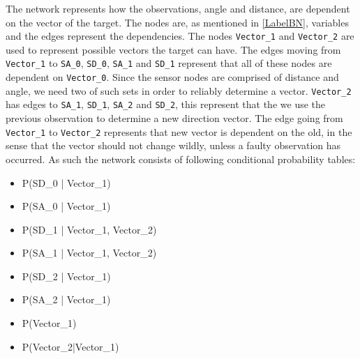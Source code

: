 The network represents how the observations, angle and distance, are dependent
on the vector of the target. The nodes are, as mentioned in \autoref{LabelBN},
variables and the edges represent the dependencies. The nodes
\texttt{Vector\_1} and \texttt{Vector\_2} are used to represent possible
vectors the target can have. The edges moving from \texttt{Vector\_1} to
\texttt{SA\_0}, \texttt{SD\_0}, \texttt{SA\_1} and \texttt{SD\_1} represent
that all of these nodes are dependent on \texttt{Vector\_0}. Since the sensor
nodes are comprised of distance and angle, we need two of such sets in order to
reliably determine a vector. \texttt{Vector\_2} has edges to \texttt{SA\_1},
\texttt{SD\_1}, \texttt{SA\_2} and \texttt{SD\_2}, this represent that the we
use the previous observation to determine a new direction vector. The edge
going from \texttt{Vector\_1} to \texttt{Vector\_2} represents that new vector
is dependent on the old, in the sense that the vector should not change wildly,
unless a faulty observation has occurred. As such the network consists of
following conditional probability tables:
\begin{itemize}
  \item P(SD\_0 | Vector\_1)
  \item P(SA\_0 | Vector\_1)
  \item P(SD\_1 | Vector\_1, Vector\_2)
  \item P(SA\_1 | Vector\_1, Vector\_2)
  \item P(SD\_2 | Vector\_1)
  \item P(SA\_2 | Vector\_1)
  \item P(Vector\_1)
  \item P(Vector\_2|Vector\_1)
\end{itemize} 
